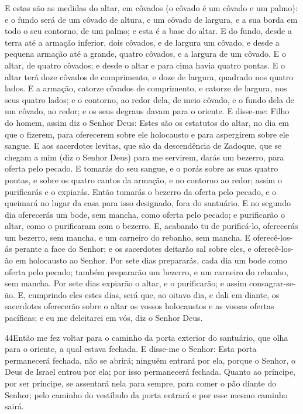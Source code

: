 E estas são as medidas do altar, em côvados (o côvado é um côvado
e um palmo): e o fundo será de um côvado de altura, e um côvado de
largura, e a sua borda em todo o seu contorno, de um palmo; e esta é
a base do altar. E do fundo, desde a terra até a armação
inferior, dois côvados, e de largura um côvado, e desde a pequena
armação até a grande, quatro côvados, e a largura de um côvado.
E o altar, de quatro côvados; e desde o altar e para cima
havia quatro pontas. E o altar terá doze côvados de
comprimento, e doze de largura, quadrado nos quatro lados. E
a armação, catorze côvados de comprimento, e catorze de largura, nos
seus quatro lados; e o contorno, ao redor dela, de meio côvado, e o
fundo dela de um côvado, ao redor; e os seus degraus davam para o
oriente. E disse-me: Filho do homem, assim diz o Senhor Deus:
Estes são os estatutos do altar, no dia em que o fizerem, para
oferecerem sobre ele holocausto e para aspergirem sobre ele sangue.
E aos sacerdotes levitas, que são da descendência de Zadoque,
que se chegam a mim (diz o Senhor Deus) para me servirem, darás um
bezerro, para oferta pelo pecado. E tomarás do seu sangue, e
o porás sobre as suas quatro pontas, e sobre os quatro cantos da
armação, e no contorno ao redor; assim o purificarás e o expiarás.
Então tomarás o bezerro da oferta pelo pecado, e o queimará
no lugar da casa para isso designado, fora do santuário. E no
segundo dia oferecerás um bode, sem mancha, como oferta pelo pecado;
e purificarão o altar, como o purificaram com o bezerro. E,
acabando tu de purificá-lo, oferecerás um bezerro, sem mancha, e um
carneiro do rebanho, sem mancha. E oferecê-los-ás perante a
face do Senhor; e os sacerdotes deitarão sal sobre eles, e
oferecê-los-ão em holocausto ao Senhor. Por sete dias
prepararás, cada dia um bode como oferta pelo pecado; também
prepararão um bezerro, e um carneiro do rebanho, sem mancha.
Por sete dias expiarão o altar, e o purificarão; e assim
consagrar-se-ão. E, cumprindo eles estes dias, será que, ao
oitavo dia, e dali em diante, os sacerdotes oferecerão sobre o altar
os vossos holocaustos e as vossas ofertas pacíficas; e eu me
deleitarei em vós, diz o Senhor Deus.

\medskip

\lettrine{44} Então me fez voltar para o caminho da porta
exterior do santuário, que olha para o oriente, a qual estava
fechada. E disse-me o Senhor: Esta porta permanecerá fechada,
não se abrirá; ninguém entrará por ela, porque o Senhor, o Deus de
Israel entrou por ela; por isso permanecerá fechada. Quanto ao
príncipe, por ser príncipe, se assentará nela para sempre, para
comer o pão diante do Senhor; pelo caminho do vestíbulo da porta
entrará e por esse mesmo caminho sairá.

